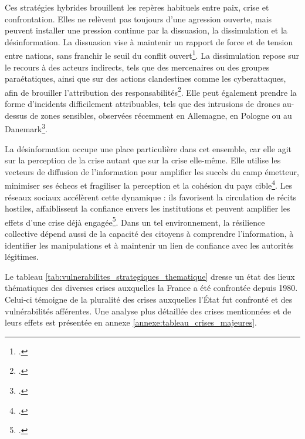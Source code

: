 \documentclass[12pt,a4paper]{article}
\begin{document}
Ces stratégies hybrides brouillent les repères habituels entre paix, crise et confrontation. Elles ne relèvent pas toujours d'une agression ouverte, mais peuvent installer une pression continue par la dissuasion, la dissimulation et la désinformation. La dissuasion vise à maintenir un rapport de force et de tension entre nations, sans franchir le seuil du conflit ouvert\footcite[p.89]{Gere_affrontement_hybride}. La dissimulation repose sur le recours à des acteurs indirects, tels que des mercenaires ou des groupes paraétatiques, ainsi que sur des actions clandestines comme les cyberattaques, afin de brouiller l'attribution des responsabilités\footcite[p.90]{Gere_affrontement_hybride}. Elle peut également prendre la forme d'incidents difficilement attribuables, tels que des intrusions de drones au-dessus de zones sensibles, observées récemment en Allemagne, en Pologne ou au Danemark\footcite{figaro_drones_europe}.

\clearpage

La désinformation occupe une place particulière dans cet ensemble, car elle agit sur la perception de la crise autant que sur la crise elle-même. Elle utilise les vecteurs de diffusion de l'information pour amplifier les succès du camp émetteur, minimiser ses échecs et fragiliser la perception et la cohésion du pays cible\footcite[p.91]{Gere_affrontement_hybride}. Les réseaux sociaux accélèrent cette dynamique : ils favorisent la circulation de récits hostiles, affaiblissent la confiance envers les institutions et peuvent amplifier les effets d'une crise déjà engagée\footcite{Sibony_reseaux_sociaux_et_guerre}. Dans un tel environnement, la résilience collective dépend aussi de la capacité des citoyens à comprendre l'information, à identifier les manipulations et à maintenir un lien de confiance avec les autorités légitimes.

Le tableau \ref{tab:vulnerabilites_strategiques_thematique} dresse un état des lieux thématiques des diverses crises auxquelles la France a été confrontée depuis 1980. Celui-ci témoigne de la pluralité des crises auxquelles l'État fut confronté et des vulnérabilités afférentes. Une analyse plus détaillée des crises mentionnées et de leurs effets est présentée en annexe \ref{annexe:tableau_crises_majeures}.
\end{document}
